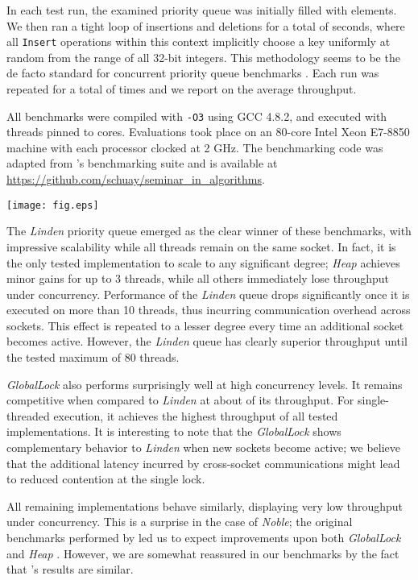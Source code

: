 \documentclass[a4paper,10pt]{article}
\begin{document}
In each test run, the examined priority queue was initially filled with 
elements. We then ran a tight loop of  insertions and  deletions
for a total of  seconds, where all \lstinline|Insert|
operations within this context implicitly choose a key uniformly at random from
the range of all 32-bit integers. This methodology seems to be the de facto standard for concurrent
priority queue benchmarks
\cite{alistarhspraylist,linden2013skiplist,shavit2000skiplist,sundell2003fast}.
Each run was repeated for a total of  times
and we report on the average throughput.

All benchmarks were compiled with \verb|-O3| using GCC 4.8.2, and executed with threads pinned to
cores. Evaluations took place
on an 80-core Intel Xeon E7-8850 machine with each processor clocked at 2 GHz.
The benchmarking code was adapted from \citeauthor{linden2013skiplist}'s
benchmarking suite and is available at \url{https://github.com/schuay/seminar_in_algorithms}.

\begin{center}
\texttt{[image: fig.eps]}\end{center}

The \textit{Linden} priority queue emerged as the clear winner of these benchmarks,
with impressive scalability while all threads remain on the same socket. In fact, it is the only
tested implementation to scale to any significant degree; \textit{Heap} achieves minor gains
for up to 3 threads, while all others immediately lose throughput under concurrency.
Performance of the \textit{Linden} queue drops significantly once it is executed on more than 10
threads, thus incurring communication overhead across sockets. This effect is repeated to a lesser
degree every time an additional socket becomes active. However, the \textit{Linden} queue has
clearly superior throughput until the tested maximum of 80 threads.

\textit{GlobalLock} also performs surprisingly well at high concurrency levels.
It remains competitive when compared to \textit{Linden} at about  of its throughput.
For single-threaded execution, it achieves the highest throughput of all tested implementations.
It is interesting to note that the \textit{GlobalLock} shows complementary behavior to
\textit{Linden} when new sockets become active; we believe that the additional latency incurred
by cross-socket communications might lead to reduced contention at the single lock.

All remaining implementations behave similarly, displaying very low throughput under concurrency.
This is a surprise in the case of \textit{Noble}; the original benchmarks performed by
\citeauthor{sundell2003fast} led us to expect improvements upon both \textit{GlobalLock}
and \textit{Heap} \cite{sundell2003fast}. However, we are somewhat reassured in our benchmarks by
the fact that \citeauthor{linden2013skiplist}'s results are similar.
\end{document}
